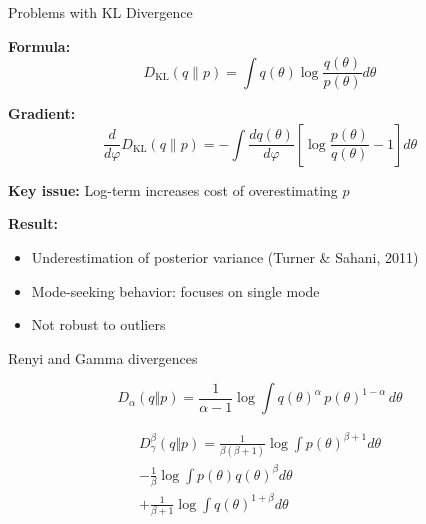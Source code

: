 \documentclass{beamer}
\theoremstyle{definition}
\theoremstyle{plain}
\begin{document}
\begin{frame}{Problems with KL Divergence}

\textbf{Formula:}
\[
D_{\text{KL}}(q\|p) = \int q(\theta) \log\frac{q(\theta)}{p(\theta)} d\theta
\]

\textbf{Gradient:}
\[
\frac{d}{d\varphi} D_{\text{KL}}(q\|p) = -\int \frac{dq(\theta)}{d\varphi} \left[\log\frac{p(\theta)}{q(\theta)} - 1\right] d\theta
\]

\vspace{0.3cm}

\textbf{Key issue:} Log-term increases cost of overestimating $p$

\vspace{0.2cm}

\textbf{Result:} 
\begin{itemize}
    \item Underestimation of posterior variance (Turner \& Sahani, 2011)
    \item Mode-seeking behavior: focuses on single mode
    \item Not robust to outliers
\end{itemize}

\end{frame}

\begin{frame}{Renyi and Gamma divergences}

\[
D_{\alpha}(q \Vert p) = \frac{1}{\alpha - 1} \log \int q(\theta)^\alpha\, p(\theta)^{1 - \alpha} \, d\theta
\]


\begin{multline*}
    D_{\gamma}^{\beta}(q \Vert p) = \frac{1}{\beta(\beta+1)} \log \int p(\theta)^{\beta + 1} d\theta \\
    - \frac{1}{\beta} \log \int p(\theta)q(\theta)^{\beta} d\theta \\
    + \frac{1}{\beta+1} \log \int q(\theta)^{1+\beta} d\theta
\end{multline*}


\end{frame}
\end{document}

